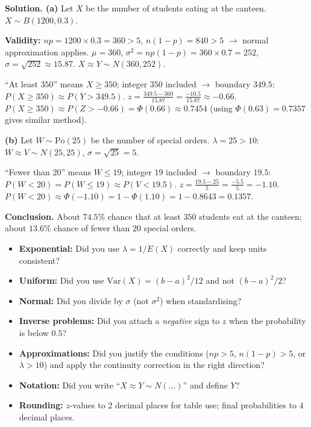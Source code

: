 \documentclass[11pt]{article}
\begin{document}
\begin{exoresolu}
\textbf{Solution. (a)} Let $X$ be the number of students eating at the canteen. $X \sim B(1200, 0.3)$.

\textbf{Validity:} $np = 1200 \times 0.3 = 360 > 5$, $n(1-p) = 840 > 5$ $\rightarrow$ normal approximation applies.
$\mu = 360$, $\sigma^{2} = np(1-p) = 360 \times 0.7 = 252$, $\sigma = \sqrt{252} \approx 15.87$.
$X \approx Y \sim N(360, 252)$.

``At least $350$'' means $X \geq 350$; integer $350$ included $\rightarrow$ boundary $349.5$:
$P(X \geq 350) \approx P(Y > 349.5)$.
$z = \frac{349.5 - 360}{15.87} = \frac{-10.5}{15.87} \approx -0.66$.
$P(X \geq 350) \approx P(Z > -0.66) = \Phi(0.66) \approx 0.7454$ (using $\Phi(0.63)=0.7357$ gives similar method).

\textbf{(b)} Let $W \sim \mathrm{Po}(25)$ be the number of special orders. $\lambda = 25 > 10$:
$W \approx V \sim N(25, 25)$, $\sigma = \sqrt{25} = 5$.

``Fewer than $20$'' means $W \leq 19$; integer $19$ included $\rightarrow$ boundary $19.5$:
$P(W < 20) = P(W \leq 19) \approx P(V < 19.5)$.
$z = \frac{19.5 - 25}{5} = \frac{-5.5}{5} = -1.10$.
$P(W < 20) \approx \Phi(-1.10) = 1 - \Phi(1.10) = 1 - 0.8643 = 0.1357$.

\textbf{Conclusion.} About $74.5\%$ chance that at least $350$ students eat at the canteen; about $13.6\%$ chance of fewer than $20$ special orders.
\end{exoresolu}

\begin{attention}
\begin{itemize}
\item \textbf{Exponential:} Did you use $\lambda = 1/E(X)$ correctly and keep units consistent?
\item \textbf{Uniform:} Did you use $\mathrm{Var}(X) = (b-a)^{2}/12$ and not $(b-a)^{2}/2$?
\item \textbf{Normal:} Did you divide by $\sigma$ (not $\sigma^{2}$) when standardising?
\item \textbf{Inverse problems:} Did you attach a \emph{negative} sign to $z$ when the probability is below $0.5$?
\item \textbf{Approximations:} Did you justify the conditions ($np>5$, $n(1-p)>5$, or $\lambda > 10$) and apply the continuity correction in the right direction?
\item \textbf{Notation:} Did you write ``$X \approx Y \sim N(\ldots)$'' and define $Y$?
\item \textbf{Rounding:} $z$-values to 2 decimal places for table use; final probabilities to 4 decimal places.
\end{itemize}
\end{attention}
\end{document}
